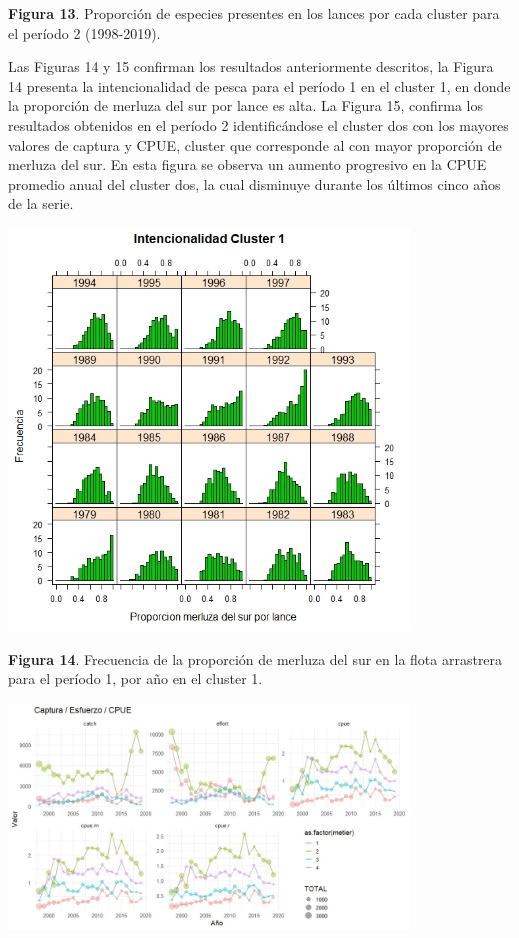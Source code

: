 \documentclass[
  spanish,
]{article}
\begin{document}
\small \textbf{Figura 13}. Proporción de especies presentes en los
lances por cada cluster para el período 2 (1998-2019). \vspace{0.5cm}
\normalsize

Las Figuras 14 y 15 confirman los resultados anteriormente descritos, la
Figura 14 presenta la intencionalidad de pesca para el período 1 en el
cluster 1, en donde la proporción de merluza del sur por lance es alta.
La Figura 15, confirma los resultados obtenidos en el período 2
identificándose el cluster dos con los mayores valores de captura y
CPUE, cluster que corresponde al con mayor proporción de merluza del
sur. En esta figura se observa un aumento progresivo en la CPUE promedio
anual del cluster dos, la cual disminuye durante los últimos cinco años
de la serie.

\begin{center}
\includegraphics[width=0.8\textwidth]{Figuras/Figura_14.png}
\end{center}

\small \textbf{Figura 14}. Frecuencia de la proporción de merluza del
sur en la flota arrastrera para el período 1, por año en el cluster 1.
\vspace{0.5cm} \normalsize

\begin{center}
\includegraphics[width=0.8\textwidth]{Figuras/Figura_15.png}
\end{center}
\end{document}
